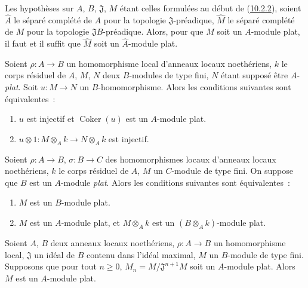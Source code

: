 \begin{env}[10.2.3]
\label{0.10.2.3-fr}
Les hypothèses sur $A$, $B$, $\mathfrak{J}$, $M$ étant celles formulées au
début de (\hyperref[0.10.2.2-fr]{10.2.2}), soient $\widehat A$ le séparé
complété de $A$ pour la topologie $\mathfrak{J}$-préadique, $\widehat M$ le
séparé complété de $M$ pour la topologie $\mathfrak{J}B$-préadique. Alors,
pour que $M$ soit un $A$-module plat, il faut et il suffit que $\widehat M$
soit un $\widehat A$-module plat.
\end{env}

\begin{env}[10.2.4]
\label{0.10.2.4-fr}
Soient $\rho:A\to B$ un homomorphisme local d'anneaux locaux noethériens, $k$
le corps résiduel de $A$, $M$, $N$ deux $B$-modules de type fini, $N$ étant
supposé être $A$-\emph{plat}. Soit $u:M\to N$ un $B$-homomorphisme. Alors les
conditions suivantes sont équivalentes~:
\begin{enumerate}
  \item[a)] $u$ est injectif et $\operatorname{Coker}(u)$ est un $A$-module plat.
  \item[b)] $u\otimes1:M\otimes_A k\to N\otimes_A k$ est injectif.
\end{enumerate}
\end{env}

\begin{env}[10.2.5]
\label{0.10.2.5-fr}
Soient $\rho:A\to B$, $\sigma:B\to C$ des homomorphismes locaux d'anneaux
locaux noethériens, $k$ le corps résiduel de $A$, $M$ un $C$-module de type
fini. On suppose que $B$ est un $A$-module \emph{plat}. Alors les conditions
suivantes sont équivalentes~:
\begin{enumerate}
  \item[$a)$] $M$ est un $B$-module plat.
  \item[$b)$] $M$ est un $A$-module plat, et $M\otimes_A k$ est un
    $(B\otimes_A k)$-module plat.
\end{enumerate}
\end{env}

\begin{proposition}[10.2.6]
\label{0.10.2.6-fr}
Soient $A$, $B$ deux anneaux locaux noethériens, $\rho:A\to B$ un
homomorphisme local, $\mathfrak{J}$ un idéal de $B$ contenu dans l'idéal
maximal, $M$ un $B$-module de type fini. Supposons que pour tout $n\geq0$,
$M_n=M/\mathfrak{J}^{n+1}M$ soit un $A$-module plat. Alors $M$ est un
$A$-module plat.
\end{proposition}

